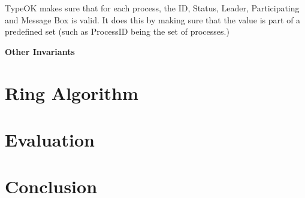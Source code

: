 \documentclass{article}
\begin{document}
TypeOK makes sure that for each process, the ID, Status, Leader, Participating and Message Box is valid. It does this by making sure that the value is part of a predefined set (such as ProcessID being the set of processes.)

\textbf{Other Invariants} \\



\section{Ring Algorithm}

\lipsum[1]

\section{Evaluation}

\lipsum[2]

\section{Conclusion}

\lipsum[3]
\end{document}
